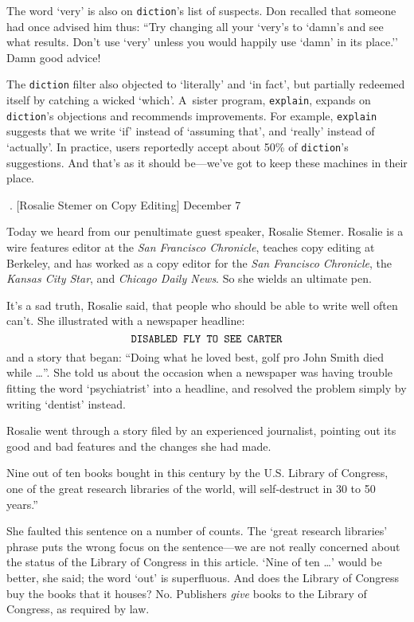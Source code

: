 The word `very' is also on {\tt diction}'s list of suspects.
 Don recalled that someone had once advised him thus: ``Try
changing all your `very's to `damn's and see what results.  Don't use
`very' unless you would happily use `damn' in its place.''  Damn good
advice! 

The {\tt diction} filter also objected to `literally' and `in fact', but
partially redeemed itself by catching a wicked `which'. A~sister
program, {\tt explain}, expands on {\tt diction}'s objections and recommends
improvements. For example, {\tt explain} suggests that we write `if' instead
of `assuming that', and `really' instead of `actually'. In practice,
users  reportedly
accept about 50\% of {\tt diction}'s suggestions. And that's as it
should be---we've got to keep these machines in their place.

. [Rosalie Stemer on Copy Editing] \pmr December 7

Today we heard from our penultimate guest speaker, Rosalie Stemer.
Rosalie is a wire features editor at the {\sl San Francisco Chronicle}, 
teaches copy editing at Berkeley, and has worked 
as a copy editor for the {\sl San Francisco Chronicle},
 the {\sl Kansas City Star}, and {\sl Chicago Daily News}. 
So she wields an ultimate pen.

It's a sad truth, Rosalie said, that people who should be able to
write well often can't. She illustrated with a newspaper headline:
$$\advance\abovedisplayskip-3pt
\advance\belowdisplayskip-3pt
\hbox{\tt DISABLED FLY TO SEE CARTER}$$
and a story that began: ``Doing what he loved best, golf pro John
Smith died while \dots''. She told us
about the occasion when a newspaper was having trouble fitting the
word `psychiatrist' into a headline, and resolved the problem simply
by writing `dentist' instead.

Rosalie went through a story filed by an experienced journalist,
pointing out its good and bad features and the changes she had made.

{\narrower\smallskip\noindent
{}Nine out of ten books bought in this century by
the U.S. Library of Congress, one of the great research libraries of
the world, will self-destruct in 30 to 50 years.'' 
\smallskip}

She faulted this sentence on a
number of counts. The `great research libraries' phrase puts the wrong
focus on the sentence---we are not really concerned about the status
of the Library of Congress in this article. `Nine of ten \dots' would be
better, she said; the word `out' is superfluous. And does the Library
of Congress buy the books that it houses?  No.
Publishers {\it give\/} books to the Library of Congress, as required by law.

